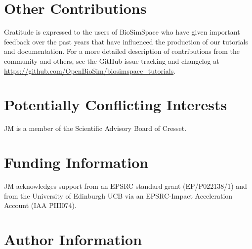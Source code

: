 \documentclass[9pt,tutorial,pubversion]{livecoms}
\newcommand{\githubrepository}{\url{https://github.com/OpenBioSim/biosimspace_tutorials}}  %
\begin{document}
\section{Other Contributions}
%
Gratitude is expressed to the users of BioSimSpace who have given important feedback over the past years that have influenced the production of our tutorials and documentation. 
For a more detailed description of contributions from the community and others, see the GitHub issue tracking and changelog at \githubrepository.

\section{Potentially Conflicting Interests}
JM is a member of the Scientific Advisory Board of Cresset. 

\section{Funding Information}
JM acknowledges support from an EPSRC standard grant (EP/P022138/1) and from the University of Edinburgh UCB via an EPSRC-Impact Acceleration Account (IAA PIII074).

\section*{Author Information}
\makeorcid




\end{document}
